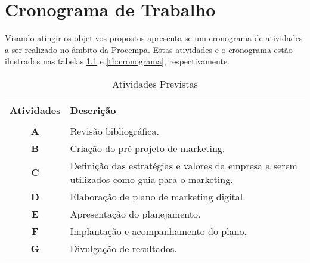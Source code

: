 \chapter {Cronograma de Trabalho}

Visando atingir os objetivos propostos apresenta-se um cronograma
de atividades a ser realizado no âmbito da Procempa. Estas atividades e o cronograma estão ilustrados nas tabelas \ref{tb:atividades} e
\ref{tb:cronograma}, respectivamente.


\begin{table}[!htb]
  \centering
  \caption{Atividades Previstas}\label{tb:atividades}
  \begin{tabular}{cp{12cm}}
    \hline \hline &\\[-0.4cm]
    \textbf{Atividades} & \textbf{Descrição} \\
    \hline
    &\\[-0.4cm]
    \textbf{A} & Revisão bibliográfica. \\[0.2cm]
    \textbf{B} & Criação do pré-projeto de marketing.\\[0.2cm]
    \textbf{C} & Definição das estratégias e valores da empresa a serem utilizados como guia para o marketing.\\[0.2cm]
    \textbf{D} & Elaboração de plano de marketing digital. \\[0.2cm]
    \textbf{E} & Apresentação do planejamento.\\[0.2cm]
    \textbf{F} & Implantação e acompanhamento do plano.\\[0.2cm]
    \textbf{G} & Divulgação de resultados.\\[0.2cm]
    \hline \hline
  \end{tabular}
\end{table}


